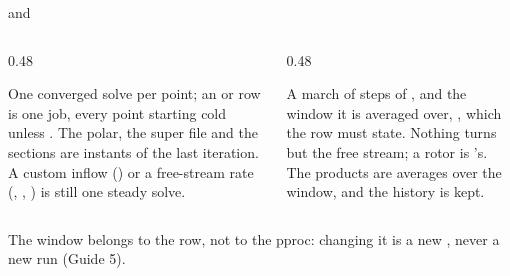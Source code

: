 \begin{frame}{ and }
\begin{columns}[T]
\begin{column}{0.48\textwidth}
\begin{block}{}
\small One converged solve per point; an  or
 row is one job, every point starting cold unless
. The polar, the super file and the sections are
instants of the last iteration. A custom inflow () or a
free-stream rate (, , )
is still one steady solve.
\end{block}
\end{column}
\begin{column}{0.48\textwidth}
\begin{block}{}
\small A march of  steps of , and
the window it is averaged over, , which the row must
state. Nothing turns but the free stream; a rotor is
's. The products are averages over the window, and the
history is kept.
\end{block}
\end{column}
\end{columns}
\begin{takeaway}The window belongs to the row, not to the pproc: changing it
is a new , never a new run (Guide 5).\end{takeaway}
\end{frame}

